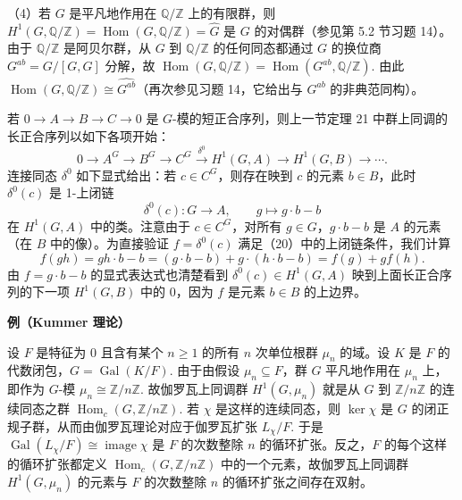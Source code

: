 （4）若 \(G\) 是平凡地作用在 \(\mathbb{Q}/\mathbb{Z}\) 上的有限群，则 \(H^1(G, \mathbb{Q}/\mathbb{Z}) = \operatorname{Hom}(G, \mathbb{Q}/\mathbb{Z}) = \widehat G\) 是 \(G\) 的对偶群（参见第 5.2 节习题 14）。由于 \(\mathbb{Q}/\mathbb{Z}\) 是阿贝尔群，从 \(G\) 到 \(\mathbb{Q}/\mathbb{Z}\) 的任何同态都通过 \(G\) 的换位商 \(G^{ab} = G/[G,G]\) 分解，故 \(\operatorname{Hom}(G, \mathbb{Q}/\mathbb{Z}) = \operatorname{Hom}(G^{ab}, \mathbb{Q}/\mathbb{Z})\). 由此 \(\operatorname{Hom}(G, \mathbb{Q}/\mathbb{Z}) \cong \widehat{G^{ab}}\)（再次参见习题 14，它给出与 \(G^{ab}\) 的非典范同构）。

若 \(0 \to A \to B \to C \to 0\) 是 \(G\)-模的短正合序列，则上一节定理 21 中群上同调的长正合序列以如下各项开始：
\[
0 \to A^G \to B^G \to C^G \xrightarrow{\delta^0} H^1(G, A) \to H^1(G, B) \to \cdots.
\]
连接同态 \(\delta^0\) 如下显式给出：若 \(c \in C^G\)，则存在映到 \(c\) 的元素 \(b \in B\)，此时 \(\delta^0(c)\) 是 1-上闭链
\[
\delta^0(c) : G \to A, \qquad g \mapsto g \cdot b-b
\]
在 \(H^1(G, A)\) 中的类。注意由于 \(c \in C^G\)，对所有 \(g \in G\)，\(g \cdot b-b\) 是 \(A\) 的元素（在 \(B\) 中的像）。为直接验证 \(f = \delta^0(c)\) 满足（20）中的上闭链条件，我们计算
\[
f(gh) = gh \cdot b-b = (g \cdot b-b)+g \cdot (h \cdot b-b) = f(g)+gf(h).
\]
由 \(f = g \cdot b-b\) 的显式表达式也清楚看到 \(\delta^0(c) \in H^1(G, A)\) 映到上面长正合序列的下一项 \(H^1(G, B)\) 中的 0，因为 \(f\) 是元素 \(b \in B\) 的上边界。

\noindent\textbf{例（Kummer 理论）}

设 \(F\) 是特征为 0 且含有某个 \(n \geq 1\) 的所有 \(n\) 次单位根群 \(\mu_n\) 的域。设 \(K\) 是 \(F\) 的代数闭包，\(G = \operatorname{Gal}(K/F)\). 由于由假设 \(\mu_n \subseteq F\)，群 \(G\) 平凡地作用在 \(\mu_n\) 上，即作为 \(G\)-模 \(\mu_n \cong \mathbb{Z}/n\mathbb{Z}\). 故伽罗瓦上同调群 \(H^1(G, \mu_n)\) 就是从 \(G\) 到 \(\mathbb{Z}/n\mathbb{Z}\) 的连续同态之群 \(\operatorname{Hom}_c(G, \mathbb{Z}/n\mathbb{Z})\). 若 \(\chi\) 是这样的连续同态，则 \(\ker\chi\) 是 \(G\) 的闭正规子群，从而由伽罗瓦理论对应于伽罗瓦扩张 \(L_\chi/F\). 于是 \(\operatorname{Gal}(L_\chi/F) \cong \operatorname{image}\chi\) 是 \(F\) 的次数整除 \(n\) 的循环扩张。反之，\(F\) 的每个这样的循环扩张都定义 \(\operatorname{Hom}_c(G, \mathbb{Z}/n\mathbb{Z})\) 中的一个元素，故伽罗瓦上同调群 \(H^1(G, \mu_n)\) 的元素与 \(F\) 的次数整除 \(n\) 的循环扩张之间存在双射。

